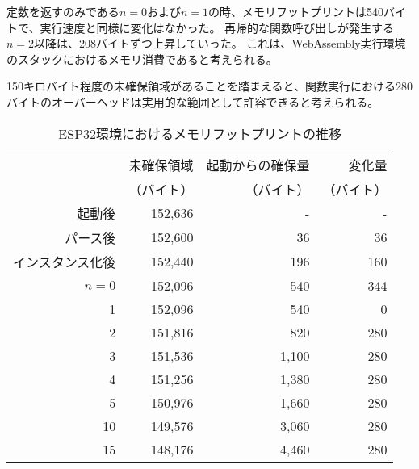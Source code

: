 定数を返すのみである$n=0$および$n=1$の時、メモリフットプリントは540バイトで、実行速度と同様に変化はなかった。
再帰的な関数呼び出しが発生する$n=2$以降は、208バイトずつ上昇していった。
これは、WebAssembly実行環境のスタックにおけるメモリ消費であると考えられる。

150キロバイト程度の未確保領域があることを踏まえると、関数実行における280バイトのオーバーヘッドは実用的な範囲として許容できると考えられる。

\begin{table}[htbp]
  \caption{ESP32環境におけるメモリフットプリントの推移}
  \label{tab:heap_size}
  \begin{center}
    \begin{tabular}{rrrr}
      \hline
      & 未確保領域 & 起動からの確保量 & 変化量 \\
      & （バイト） & （バイト） & （バイト） \\ \hline \hline
      起動後      & 152,636 & - & - \\ \hline
      パース後     & 152,600 & 36 & 36 \\ \hline
      インスタンス化後 & 152,440  & 196 & 160 \\ \hline
      $n=0$  & 152,096 &   540 & 344 \\ \hline
      1  & 152,096 &   540 &   0 \\ \hline
      2  & 151,816 &   820 & 280 \\ \hline
      3  & 151,536 & 1,100 & 280 \\ \hline
      4  & 151,256 & 1,380 & 280 \\ \hline
      5  & 150,976 & 1,660 & 280 \\ \hline
      10 & 149,576 & 3,060 & 280 \\ \hline
      15 & 148,176 & 4,460 & 280 \\ \hline

\end{tabular}
\end{center}
\end{table}
